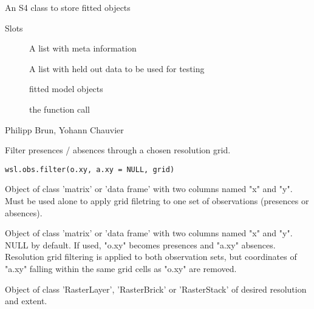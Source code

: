 \documentclass[a4paper]{book}
\begin{document}
%
\begin{Description}\relax
An S4 class to store fitted objects
\end{Description}
%
\begin{Section}{Slots}

\begin{description}

\item[] A list with meta information

\item[] A list with held out data to be used for testing

\item[] fitted model objects

\item[] the function call

\end{description}
\end{Section}
%
\begin{Author}\relax
Philipp Brun, Yohann Chauvier
\end{Author}
%
\begin{Description}\relax
Filter presences / absences through a chosen resolution grid.
\end{Description}
%
\begin{Usage}
\begin{verbatim}
wsl.obs.filter(o.xy, a.xy = NULL, grid)
\end{verbatim}
\end{Usage}
%
\begin{Arguments}
\begin{ldescription}
\item[\code{o.xy}] Object of class 'matrix' or 'data frame' with two columns named
"x" and "y". Must be used alone to apply grid filetring to one set of observations
(presences or absences).

\item[\code{a.xy}] Object of class 'matrix' or 'data frame' with two columns named "x" and
"y". NULL by default. If used, "o.xy" becomes presences and "a.xy" absences.
Resolution grid filtering is applied to both observation sets, but coordinates of
"a.xy" falling within the same grid cells as "o.xy" are removed.

\item[\code{grid}] Object of class 'RasterLayer', 'RasterBrick' or 'RasterStack' of
desired resolution and extent.
\end{ldescription}
\end{Arguments}
\end{document}
